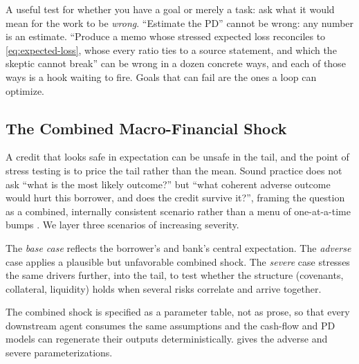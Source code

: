 \begin{context}
A useful test for whether you have a goal or merely a task: ask what it would mean
for the work to be \emph{wrong}. ``Estimate the PD'' cannot be wrong: any number
is an estimate. ``Produce a memo whose stressed expected loss reconciles to
\cref{eq:expected-loss}, whose every ratio ties to a source statement, and which
the skeptic cannot break'' can be wrong in a dozen concrete ways, and each of those
ways is a hook waiting to fire. Goals that can fail are the ones a loop can
optimize.
\end{context}

\subsection{The Combined Macro-Financial Shock}\label{subsec:credit-shock}

A credit that looks safe in expectation can be unsafe in the tail, and the point of
stress testing is to price the tail rather than the mean. Sound practice does not
ask ``what is the most likely outcome?'' but ``what coherent adverse outcome would
hurt this borrower, and does the credit survive it?'', framing the question as a
combined, internally consistent scenario rather than a menu of one-at-a-time bumps
\citep{bcbs2018stress}. We layer three scenarios of increasing severity.

\begin{definition}\label{def:scenario-layering}
The \emph{base case} reflects the borrower's and bank's central expectation. The
\emph{adverse} case applies a plausible but unfavorable combined shock. The
\emph{severe} case stresses the same drivers further, into the tail, to test
whether the structure (covenants, collateral, liquidity) holds when several risks
correlate and arrive together.
\end{definition}

The combined shock is specified as a parameter table, not as prose, so that every
downstream agent consumes the same assumptions and the cash-flow and PD models can
regenerate their outputs deterministically.  gives the
adverse and severe parameterizations.

